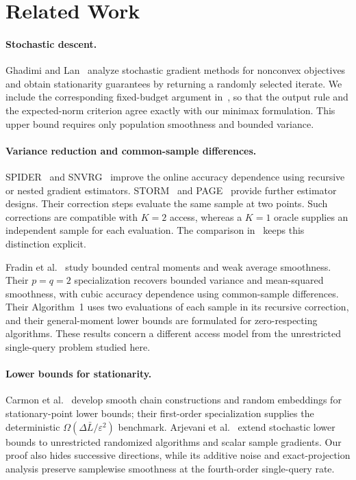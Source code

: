 \documentclass[11pt]{article}
\newcommand{\eps}{\varepsilon}
\theoremstyle{definition}
\theoremstyle{remark}
\begin{document}
\section{Related Work}\label{sec:related}

\paragraph{Stochastic descent.}
Ghadimi and Lan~\cite{ghadimi} analyze stochastic gradient methods for
nonconvex objectives and obtain stationarity guarantees by returning a
randomly selected iterate. We include the corresponding fixed-budget
argument in~, so that the output rule and the expected-norm
criterion agree exactly with our minimax formulation. This upper bound
requires only population smoothness and bounded variance.

\paragraph{Variance reduction and common-sample differences.}
SPIDER~\cite{spider} and SNVRG~\cite{snvrg} improve the online accuracy
dependence using recursive or nested gradient estimators. STORM~\cite{storm}
and PAGE~\cite{page} provide further estimator designs. Their correction
steps evaluate the same sample at two points. Such corrections are
compatible with $K=2$ access, whereas a $K=1$ oracle supplies an independent
sample for each evaluation. The comparison in~ keeps
this distinction explicit.

Fradin et al.~\cite{fradin2026} study bounded central moments and weak average
smoothness. Their $p=q=2$ specialization recovers bounded variance and
mean-squared smoothness, with cubic accuracy dependence using
common-sample differences. Their Algorithm~1 uses two evaluations of each
sample in its recursive correction, and their general-moment lower bounds
are formulated for zero-respecting algorithms. These results concern a
different access model from the unrestricted single-query problem studied
here.

\paragraph{Lower bounds for stationarity.}
Carmon et al.~\cite{carmon} develop smooth chain constructions and random
embeddings for stationary-point lower bounds; their first-order
specialization supplies the deterministic
$\Omega(\Delta\bar L/\eps^2)$ benchmark. Arjevani et
al.~\cite{arjevani} extend stochastic lower bounds to unrestricted
randomized algorithms and scalar sample gradients. Our proof also hides
successive directions, while its additive noise and exact-projection
analysis preserve samplewise smoothness at the fourth-order single-query
rate.
\end{document}
